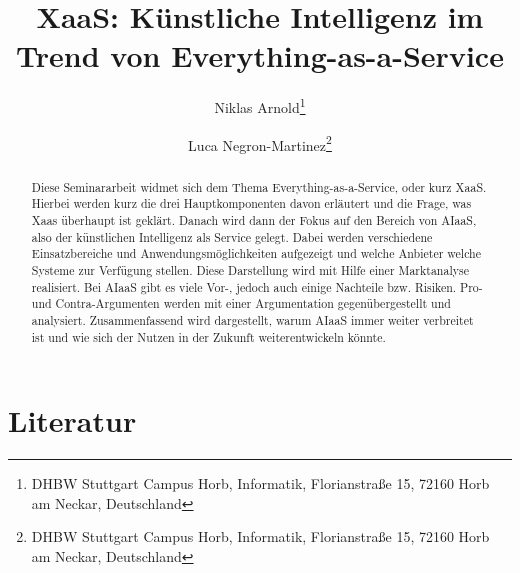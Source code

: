 \documentclass[]{lni}
\begin{document}
\title[Everything-as-a-Service]{XaaS: Künstliche Intelligenz im Trend von Everything-as-a-Service}
\author[Niklas Arnold \and Luca Negron-Martinez]
{Niklas Arnold\footnote{DHBW Stuttgart Campus Horb, Informatik, Florianstraße 15, 72160 Horb am Neckar, Deutschland } \and
Luca Negron-Martinez\footnote{DHBW Stuttgart Campus Horb, Informatik, Florianstraße 15, 72160 Horb am Neckar, Deutschland
}}
\maketitle

\begin{abstract}
Diese Seminararbeit widmet sich dem Thema Everything-as-a-Service, oder kurz XaaS. Hierbei werden kurz die drei Hauptkomponenten davon erläutert und die Frage, was Xaas überhaupt ist geklärt. Danach wird dann der Fokus auf den Bereich von AIaaS, also der künstlichen Intelligenz als Service gelegt. Dabei werden verschiedene Einsatzbereiche und Anwendungsmöglichkeiten aufgezeigt und welche Anbieter welche Systeme zur Verfügung stellen. Diese Darstellung wird mit Hilfe einer Marktanalyse realisiert. Bei AIaaS gibt es viele Vor-, jedoch auch einige Nachteile bzw. Risiken. Pro- und Contra-Argumenten werden mit einer Argumentation gegenübergestellt und analysiert. 
Zusammenfassend wird dargestellt, warum AIaaS immer weiter verbreitet ist und wie sich der Nutzen in der Zukunft weiterentwickeln könnte.
\end{abstract}














\setcounter{biburlnumpenalty}{9000}
\setcounter{biburllcpenalty}{9000}
\setcounter{biburlucpenalty}{9000}

\newpage
\section{Literatur}
\printbibliography[title=""]
\end{document}
